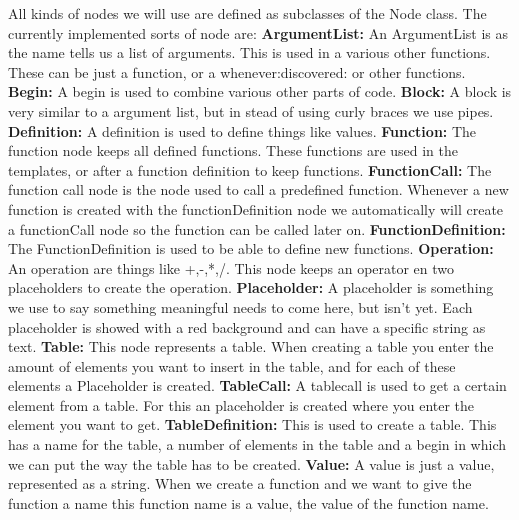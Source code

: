 \documentclass[a4paper,12pt]{report}
\begin{document}
All kinds of nodes we will use are defined as subclasses of the Node class. The currently implemented sorts of node are:
\newline\textbf{ArgumentList: } An ArgumentList is as the name tells us a list of arguments. This is used in a various other functions.
These can be just a function, or a whenever:discovered: or other functions.
\newline\textbf{Begin: } A begin is used to combine various other parts of code. 
\newline\textbf{Block: } A block is very similar to a argument list, but in stead of using curly braces we use pipes.
\newline\textbf{Definition: } A definition is used to define things like values.
\newline\textbf{Function: } The function node keeps all defined functions. These functions are used in the templates, or after a
function definition to keep functions.
\newline\textbf{FunctionCall: }The function call node is the node used to call a predefined function. Whenever a new function is created with the functionDefinition node we automatically will create
a functionCall node so the function can be called later on.
\newline\textbf{FunctionDefinition: } The FunctionDefinition is used to be able to define new functions.
\newline\textbf{Operation: } An operation are things like +,-,*,/. This node keeps an operator en two placeholders to create the operation.
\newline\textbf{Placeholder: } A placeholder is something we use to say something meaningful needs to come here, but isn't yet. Each placeholder is showed with a red background and can have a specific string as 
text.
\newline\textbf{Table: } This node represents a table. When creating a table you enter the amount of elements you want to insert in the table, and for each of these elements a Placeholder is created. 
\newline\textbf{TableCall: } A tablecall is used to get a certain element from a table. For this an placeholder is created where you enter the element you want to get.
\newline\textbf{TableDefinition: } This is used to create a table. This has a name for the table, a number of elements in the table and a begin in which we can put the way the table has to be created.
\newline\textbf{Value: } A value is just a value, represented as a string. When we create a function and we want to give the function a name this function name is a value, the value of the function name. 
\end{document}
